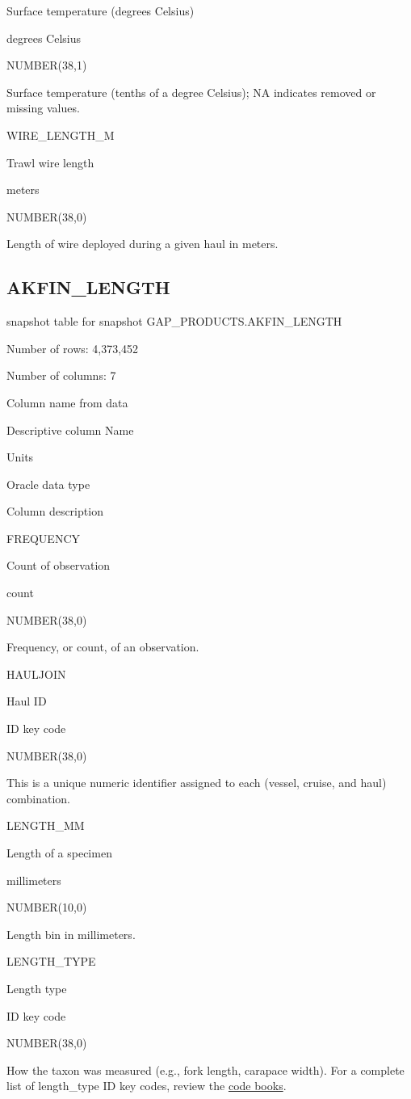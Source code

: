 \documentclass[
  letterpaper,
  oneside,
  open=any]{scrbook}
\begin{document}
Surface temperature (degrees Celsius)

degrees Celsius

NUMBER(38,1)

Surface temperature (tenths of a degree Celsius); NA indicates removed
or missing values.

WIRE\_LENGTH\_M

Trawl wire length

meters

NUMBER(38,0)

Length of wire deployed during a given haul in meters.

\hypertarget{akfin_length}{%
\subsection{AKFIN\_LENGTH}\label{akfin_length}}

snapshot table for snapshot GAP\_PRODUCTS.AKFIN\_LENGTH

Number of rows: 4,373,452

Number of columns: 7

Column name from data

Descriptive column Name

Units

Oracle data type

Column description

FREQUENCY

Count of observation

count

NUMBER(38,0)

Frequency, or count, of an observation.

HAULJOIN

Haul ID

ID key code

NUMBER(38,0)

This is a unique numeric identifier assigned to each (vessel, cruise,
and haul) combination.

LENGTH\_MM

Length of a specimen

millimeters

NUMBER(10,0)

Length bin in millimeters.

LENGTH\_TYPE

Length type

ID key code

NUMBER(38,0)

How the taxon was measured (e.g., fork length, carapace width). For a
complete list of length\_type ID key codes, review the
\href{https://www.fisheries.noaa.gov/resource/document/groundfish-survey-species-code-manual-and-data-codes-manual}{code
books}.
\end{document}
